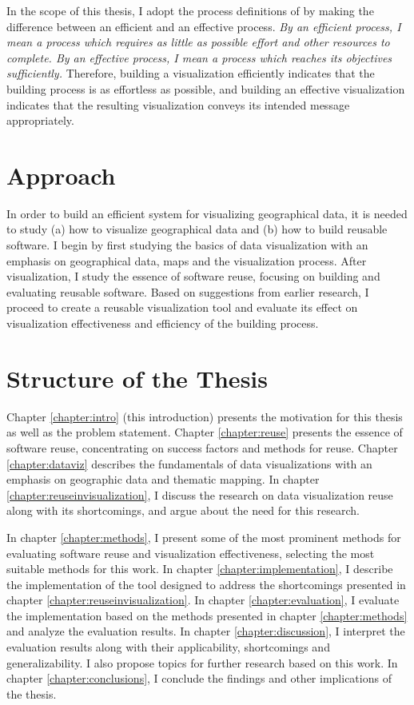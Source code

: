 In the scope of this thesis, I adopt the process definitions of \citet{van_wijk_value_2005} by making the difference between an efficient and an effective process. \emph{By an efficient process, I mean a process which requires as little as possible effort and other resources to complete. By an effective process, I mean a process which reaches its objectives sufficiently.} Therefore, building a visualization efficiently indicates that the building process is as effortless as possible, and building an effective visualization indicates that the resulting visualization conveys its intended message appropriately.



\section{Approach}

In order to build an efficient system for visualizing geographical data, it is needed to study (a) how to visualize geographical data and (b) how to build reusable software. I begin by first studying the basics of data visualization with an emphasis on geographical data, maps and the visualization process. After visualization, I study the essence of software reuse, focusing on building and evaluating reusable software. Based on suggestions from earlier research, I proceed to create a reusable visualization tool and evaluate its effect on visualization effectiveness and efficiency of the building process.

\section{Structure of the Thesis}
\label{section:structure} 

Chapter \ref{chapter:intro} (this introduction) presents the motivation for this thesis as well as the problem statement. Chapter \ref{chapter:reuse} presents the essence of software reuse, concentrating on success factors and methods for reuse. Chapter \ref{chapter:dataviz} describes the fundamentals of data visualizations with an emphasis on geographic data and thematic mapping. In chapter \ref{chapter:reuseinvisualization}, I discuss the research on data visualization reuse along with its shortcomings, and argue about the need for this research.

In chapter \ref{chapter:methods}, I present some of the most prominent methods for evaluating software reuse and visualization effectiveness, selecting the most suitable methods for this work. In chapter \ref{chapter:implementation}, I describe the implementation of the tool designed to address the shortcomings presented in chapter \ref{chapter:reuseinvisualization}. In chapter \ref{chapter:evaluation}, I evaluate the implementation based on the methods presented in chapter \ref{chapter:methods} and analyze the evaluation results. In chapter \ref{chapter:discussion}, I interpret the evaluation results along with their applicability, shortcomings and generalizability. I also propose topics for further research based on this work. In chapter \ref{chapter:conclusions}, I conclude the findings and other implications of the thesis.
